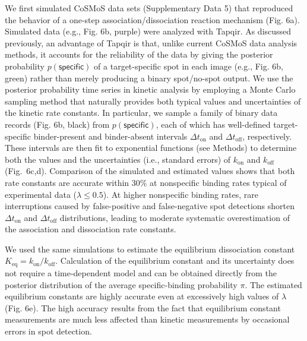 We first simulated CoSMoS data sets (Supplementary Data 5) that reproduced the behavior of a one-step association/dissociation reaction mechanism (Fig. 6a). Simulated data (e.g., Fig. 6b, purple) were analyzed with Tapqir.   As discussed previously, an advantage of Tapqir is that, unlike current CoSMoS data analysis methods, it accounts for the reliability of the data by giving the posterior probability $p(\mathsf{specific})$ of a target-specific spot in each image (e.g., Fig. 6b, green) rather than merely producing a binary spot/no-spot output.  We use the posterior probability time series in kinetic analysis by employing a Monte Carlo sampling method that naturally provides both typical values and uncertainties of the kinetic rate constants.  In particular, we sample a family of binary data records (Fig. 6b, black) from $p(\mathsf{specific})$, each of which has well-defined target-specific binder-present and binder-absent intervals $\Delta t_\mathrm{on}$ and $\Delta t_\mathrm{off}$, respectively. These intervals are then fit to exponential functions (see Methods) to determine both the values and the uncertainties (i.e., standard errors) of $k_\mathrm{on}$ and $k_\mathrm{off}$ (Fig.~6c,d). Comparison of the simulated and estimated values shows that both rate constants are accurate within 30\% at nonspecific binding rates typical of experimental data ($\lambda \leq 0.5$). At higher nonspecific binding rates, rare interruptions caused by false-positive and false-negative spot detections shorten $\Delta t_\mathrm{on}$ and $\Delta t_\mathrm{off}$ distributions, leading to moderate systematic overestimation of the association and dissociation rate constants.

We used the same simulations to estimate the equilibrium dissociation constant $K_\mathrm{eq} = k_\mathrm{on}/k_\mathrm{off}$.  Calculation of the equilibrium constant and its uncertainty does not require a time-dependent model and can be obtained directly from the posterior distribution of the average specific-binding probability $\pi$. The estimated equilibrium constants are highly accurate even at excessively  high values of $\lambda$ (Fig. 6e).  The high accuracy results from the fact that equilibrium constant measurements are much less affected than kinetic measurements by occasional errors in spot detection. 

